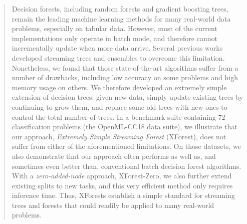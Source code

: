 \begin{abstract}
Decision forests, including random forests and gradient boosting trees, remain the leading machine learning methods for many real-world data problems, especially on tabular data.
However, most of the current implementations only operate in batch mode, and therefore cannot incrementally update when more data arrive. 
Several previous works developed streaming trees and ensembles to overcome this limitation. Nonetheless, we found that those state-of-the-art algorithms suffer from a number of drawbacks, including low accuracy on some problems and high memory usage on others. 
We therefore developed an extremely simple extension of decision trees: given new data, simply update existing trees by continuing to grow them, and replace some old trees with new ones to control the total number of trees. 
In a benchmark suite containing 72 classification problems (the OpenML-CC18 data suite), we illustrate that our approach, \textit{Extremely Simple Streaming Forest} (XForest), does not suffer from either of the aforementioned limitations. On those datasets, we also demonstrate that our approach often performs as well as, and sometimes even better than, conventional batch decision forest algorithms. 
With a \textit{zero-added-node} approach, XForest-Zero, we also further extend existing splits to new tasks, and this very efficient method only requires inference time.
Thus, XForests establish a simple standard for streaming trees and forests that could readily be applied to many real-world problems.
\end{abstract}

